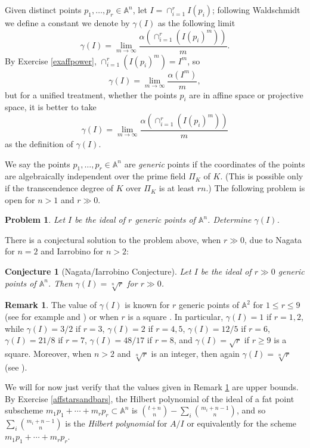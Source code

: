 \documentclass[11pt,twoside]{amsart}
\numberwithin{equation}{section}
\newtheorem{conjecture}[theorem]{Conjecture}
\newtheorem{problem}[theorem]{Problem}
\theoremstyle{definition}
\newtheorem{remark}[theorem]{Remark}
\begin{document}
Given distinct points $p_1,\ldots,p_r\in{\mathbb{A}^{{n}}}$, let $I=\cap_{i=1}^rI(p_i)$;
following Waldschmidt \cite{refW} we define a constant we denote by $\gamma(I)$ as the following limit 
$$\gamma(I)=\lim_{m\to\infty}\frac{\alpha(\cap_{i=1}^r(I(p_i)^m))}{m}.$$
By Exercise \ref{exaffpower}, $\cap_{i=1}^r(I(p_i)^m)=I^m$, so 
$$\gamma(I)=\lim_{m\to\infty}\frac{\alpha(I^m)}{m},$$
but for a unified treatment, whether the points $p_i$ are in affine space or projective
space, it is better to take $$\gamma(I)=\lim_{m\to\infty}\frac{\alpha(\cap_{i=1}^r(I(p_i)^m))}{m}$$
as the definition of $\gamma(I)$.

We say the points $p_1,\ldots,p_r\in{\mathbb{A}^{{n}}}$ are \emph{generic} points if the coordinates
of the points are algebraically independent over the prime field $\Pi_{K}$ of ${K}$.
(This is possible only if the transcendence degree of ${K}$ over $\Pi_{K}$
is at least $rn$.) The following problem is open for $n>1$ and $r\gg0$.

\begin{problem}\label{NagataConj}
Let $I$ be the ideal of $r$ generic points of ${\mathbb{A}^{{n}}}$. Determine $\gamma(I)$. 
\end{problem}

There is a conjectural solution to the problem above, when $r\gg0$, due to 
Nagata \cite{refN} for $n=2$ and Iarrobino \cite{refI} for $n>2$:

\begin{conjecture}[Nagata/Iarrobino Conjecture]\label{NagIarroConj}
Let $I$ be the ideal of $r\gg0$ generic points of ${\mathbb{A}^{{n}}}$. 
Then $\gamma(I)=\sqrt[n]{r}$ for $r\gg0$.
\end{conjecture}

\begin{remark}\label{valuesofgamma}
The value of $\gamma(I)$ is known for $r$ generic points of ${\mathbb{A}^{{2}}}$ for $1\leq r\leq 9$ (see for example
\cite[Appendix 1]{refCh} and \cite[Theorem 7]{refN2}) or when $r$ is a square \cite{refN}.
In particular, $\gamma(I)=1$ if $r=1,2$, while $\gamma(I)=3/2$ if $r=3$,
$\gamma(I)=2$ if $r=4,5$, $\gamma(I)=12/5$ if $r=6$, 
$\gamma(I)=21/8$ if $r=7$,
$\gamma(I)=48/17$ if $r=8$, and
$\gamma(I)=\sqrt{r}$ if $r\geq 9$ is a square.
Moreover, when $n>2$ and $\sqrt[n]{r}$ is an integer,
then again $\gamma(I)=\sqrt[n]{r}$ (see \cite[Theorem 6]{refEvain}).
\end{remark}

We will for now just verify that the values given
in Remark \ref{valuesofgamma} are upper bounds.
By Exercise \ref{affstarsandbars}, the Hilbert polynomial of the ideal of
a fat point subscheme $m_1p_1+\cdots+m_rp_r\subset {\mathbb{A}^{{n}}}$ 
is $\binom{t+n}{n}-\sum_i\binom{m_i+n-1}{n}$,
and so $\sum_i\binom{m_i+n-1}{n}$
is the \emph{Hilbert polynomial} for $A/I$ or equivalently for 
the scheme $m_1p_1+\cdots+m_rp_r$.
\end{document}
